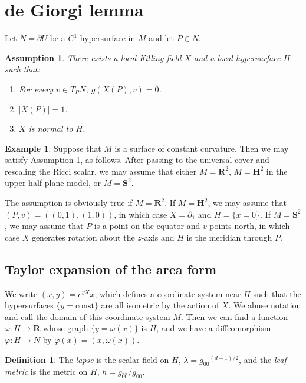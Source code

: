 \documentclass[reqno,12pt,letterpaper]{amsart}
\newcommand{\RR}{\mathbf{R}}
\newcommand{\Hyp}{\mathbf H}
\newcommand{\Sph}{\mathbf S}
\newcommand{\dfn}[1]{\emph{#1}\index{#1}}
\newtheorem{assumption}[theorem]{Assumption}
\theoremstyle{definition}
\newtheorem{definition}[theorem]{Definition}
\newtheorem{example}[theorem]{Example}
\numberwithin{equation}{section}
\begin{document}
\section{de Giorgi lemma}
Let $N = \partial U$ be a $C^1$ hypersurface in $M$ and let $P \in N$.

\begin{assumption} \label{Assume Killing Field}
There exists a local Killing field $X$ and a local hypersurface $H$ such that:
\begin{enumerate}
\item For every $v \in T_PN$, $g(X(P), v) = 0$.
\item $|X(P)| = 1$.
\item $X$ is normal to $H$.
\end{enumerate}
\end{assumption}

\begin{example}
Suppose that $M$ is a surface of constant curvature.
Then we may satisfy Assumption \ref{Assume Killing Field}, as follows.
After passing to the universal cover and rescaling the Ricci scalar, we may assume that either $M = \RR^2$, $M = \Hyp^2$ in the upper half-plane model, or $M = \Sph^2$.

The assumption is obviously true if $M = \RR^2$.
If $M = \Hyp^2$, we may assume that $(P, v) = ((0, 1), (1, 0))$, in which case $X = \partial_1$ and $H = \{x = 0\}$.
If $M = \Sph^2$, we may assume that $P$ is a point on the equator and $v$ points north, in which case $X$ generates rotation about the $z$-axis and $H$ is the meridian through $P$.
\end{example}

\subsection{Taylor expansion of the area form}
We write $(x, y) = e^{yX}x$, which defines a coordinate system near $H$ such that the hypersurfaces $\{y = \text{const}\}$ are all isometric by the action of $X$.
We abuse notation and call the domain of this coordinate system $M$.
Then we can find a function $\omega: H \to \RR$ whose graph $\{y = \omega(x)\}$ is $H$, and we have a diffeomorphism $\varphi: H \to N$ by $\varphi(x) = (x, \omega(x))$.

\begin{definition}
The \dfn{lapse} is the scalar field on $H$, $\lambda = {g_{00}}^{(d - 1)/2}$, and the \dfn{leaf metric} is the metric on $H$, $h = g_{\hat 0 \hat 0}/g_{00}$.
\end{definition}
\end{document}
